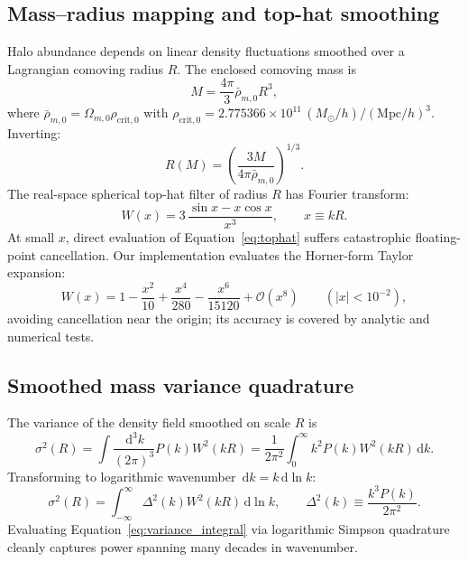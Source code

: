 \documentclass[11pt]{article}
\newcommand{\dd}{\,\mathrm d}
\newcommand{\rhobar}{\bar{\rho}_{m,0}}
\newcommand{\Mpc}{\mathrm{Mpc}}
\newcommand{\Msun}{M_\odot}
\begin{document}
\subsection{Mass--radius mapping and top-hat smoothing}
Halo abundance depends on linear density fluctuations smoothed over a Lagrangian comoving radius $R$. The enclosed comoving mass is
\begin{equation}
\boxed{M = \frac{4\pi}{3}\rhobar R^3},
\label{eq:mass_radius}
\end{equation}
where $\rhobar = \Omega_{m,0}\rho_{\mathrm{crit},0}$ with $\rho_{\mathrm{crit},0} = 2.775366 \times 10^{11}\,(\Msun/h)/(\Mpc/h)^3$. Inverting:
\begin{equation}
\boxed{R(M) = \left( \frac{3M}{4\pi\rhobar} \right)^{1/3}}.
\end{equation}
The real-space spherical top-hat filter of radius $R$ has Fourier transform:
\begin{equation}
\boxed{W(x) = 3\,\frac{\sin x - x\cos x}{x^3}}, \qquad x \equiv kR.
\label{eq:tophat}
\end{equation}
At small $x$, direct evaluation of Equation~\eqref{eq:tophat} suffers catastrophic floating-point cancellation. Our implementation evaluates the Horner-form Taylor expansion:
\begin{equation}
W(x) = 1 - \frac{x^2}{10} + \frac{x^4}{280} - \frac{x^6}{15120} + \mathcal O(x^8) \qquad (|x| < 10^{-2}),
\end{equation}
avoiding cancellation near the origin; its accuracy is covered by analytic and numerical tests.

\subsection{Smoothed mass variance quadrature}
The variance of the density field smoothed on scale $R$ is
\begin{equation}
\sigma^2(R) = \int \frac{\dd^3k}{(2\pi)^3} P(k) W^2(kR) = \frac{1}{2\pi^2}\int_0^\infty k^2 P(k) W^2(kR) \dd k.
\end{equation}
Transforming to logarithmic wavenumber $\dd k = k\dd\ln k$:
\begin{equation}
\boxed{\sigma^2(R) = \int_{-\infty}^\infty \Delta^2(k) W^2(kR) \dd\ln k}, \qquad \Delta^2(k) \equiv \frac{k^3P(k)}{2\pi^2}.
\label{eq:variance_integral}
\end{equation}
Evaluating Equation~\eqref{eq:variance_integral} via logarithmic Simpson quadrature cleanly captures power spanning many decades in wavenumber.
\end{document}
